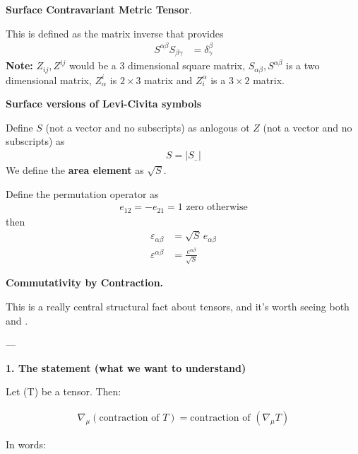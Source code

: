 \documentclass[12pt,a4paper]{report}
\begin{document}
\begin{description}
	\item \textbf{Surface Contravariant Metric Tensor}.
	
	This is defined as the matrix inverse that provides
	\begin{align*}
		S^{\alpha\beta}S_{\beta\gamma} &= \delta_\gamma^\beta
	\end{align*}\textbf{Note:} $Z_{ij}, Z^{ij}$ would be a 3 dimensional square matrix, $S_{\alpha\beta}, S^{\alpha\beta}$ is a two dimensional matrix, $Z_\alpha^i$ is $2 \times 3$ matrix and $Z_i^\alpha$ is a $3 \times 2$ matrix.
	
	\item \textbf{Surface versions of Levi-Civita symbols}
	
	Define $S$ (not a vector and no subscripts) as anlogous ot $Z$ (not a vector and no subscripts) as
	\begin{align*}
		S = |S_{..}|
	\end{align*}We define the \textbf{area element} as $\sqrt{S}$.
	
	Define the permutation operator as 
	\begin{align*}
		e_{12} = -e_{21} = 1 \text{ zero otherwise}
	\end{align*}then
	\begin{align*}
		\varepsilon_{\alpha\beta} &= \sqrt{S}\,e_{\alpha\beta} \\
		\varepsilon^{\alpha\beta} &= \frac{e^{\alpha\beta}}{\sqrt{S}} 
	\end{align*}

\HLINE

\newpage
\item \textbf{Commutativity by Contraction.}

This is a really central structural fact about tensors, and it’s worth seeing both  and .

---

\begin{description}
\item \textbf{1. The statement (what we want to understand)}

Let (T) be a tensor. Then:

\begin{align*}
\boxed{
\nabla_\mu(\text{contraction of } T) = \text{contraction of } (\nabla_\mu T) }
\end{align*}

In words:

\textbf{ }


\end{description}
\end{description}
\end{document}
